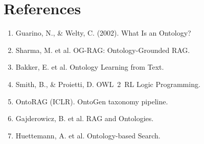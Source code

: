 \documentclass[11pt,a4paper]{article}
\begin{document}
\section{References}

\begin{enumerate}
    \item Guarino, N., \& Welty, C. (2002). What Is an Ontology?
    \item Sharma, M. et al. OG-RAG: Ontology-Grounded RAG.
    \item Bakker, E. et al. Ontology Learning from Text.
    \item Smith, B., \& Proietti, D. OWL~2~RL Logic Programming.
    \item OntoRAG (ICLR). OntoGen taxonomy pipeline.
    \item Gajderowicz, B. et al. RAG and Ontologies.
    \item Huettemann, A. et al. Ontology-based Search.
\end{enumerate}
\end{document}
